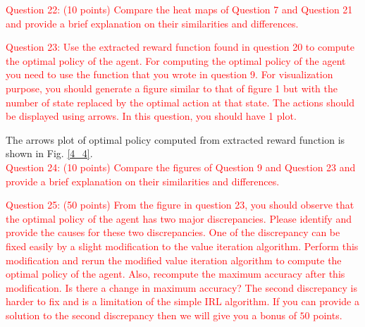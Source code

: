 \documentclass[11pt]{article}
\begin{document}
\textcolor{red}{
    Question 22: (10 points) Compare the heat maps of Question 7 and Question 21 and provide a brief explanation on their similarities and differences.
}

\textcolor{red}{
    Question 23: Use the extracted reward function found in question 20 to compute the optimal policy of the agent. For computing the optimal policy of the agent you need to use the function that you wrote in question 9. For visualization purpose, you should generate a figure similar to that of figure 1 but with the number of state replaced by the optimal action at that state. The actions should be displayed using arrows. In this question, you should have 1 plot.
}

The arrows plot of optimal policy computed from extracted reward function is shown in Fig. \ref{4_4}.\\

\textcolor{red}{
    Question 24: (10 points) Compare the figures of Question 9 and Question 23 and provide a brief explanation on their similarities and differences.
}

\textcolor{red}{
    Question 25: (50 points) From the figure in question 23, you should observe that the optimal policy of the agent has two major discrepancies. Please identify and provide the causes for these two discrepancies. One of the discrepancy can be fixed easily by a slight modification to the value iteration algorithm. Perform this modification and rerun the modified value iteration algorithm to compute the optimal policy of the agent. Also, recompute the maximum accuracy after this modification. Is there a change in maximum accuracy? The second discrepancy is harder to fix and is a limitation of the simple IRL algorithm. If you can provide a solution to the second discrepancy then we will give you a bonus of $50$ points.
}
\end{document}
